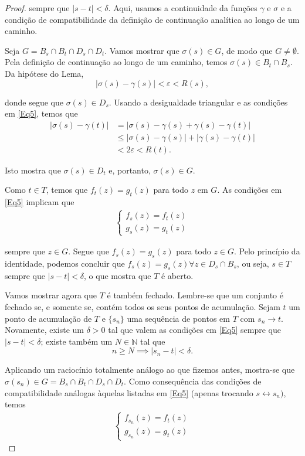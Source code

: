 \begin{proof}
sempre que $|s-t|<\delta$. Aqui, usamos a continuidade da funções $\gamma$ e $\sigma$ 
e a condição de compatibilidade da definição de continuação analítica ao longo de um
caminho.

Seja $G = B_s \cap B_t \cap D_s \cap D_t$. Vamos mostrar que 
$\sigma(s) \in G$, de modo que $G \neq \emptyset$. Pela definição de continuação 
ao longo de um caminho, temos $\sigma(s) \in B_t \cap B_s$. Da hipótese do Lema,
\begin{equation*}
|\sigma(s) - \gamma(s)| < \varepsilon < R(s),
\end{equation*}

donde segue que $\sigma(s) \in D_s$. Usando a desigualdade triangular e as condições em \ref{Eq5}, temos que 
\begin{align*}
|\sigma(s) - \gamma(t)| &= |\sigma(s) - \gamma(s) + \gamma(s) - \gamma(t)| \\
&\leq |\sigma(s) - \gamma(s)| + |\gamma(s) - \gamma(t)| \\
&< 2\varepsilon < R(t).
\end{align*}

Isto mostra que $\sigma(s) \in D_t$ e, portanto, $\sigma(s) \in G$.

Como $t \in T$, temos que $f_t(z) = g_t(z)$ para todo $z$ em $G$. 
As condições em \ref{Eq5} implicam que 
\begin{align*}
    \begin{cases}
    f_s(z) = f_t(z) \\
    g_s(z) = g_t(z)
    \end{cases}
\end{align*}

sempre que $z \in G$. Segue que $f_s(z) = g_s(z)$ para todo $z \in G$. 
Pelo princípio da identidade, podemos concluir que 
$f_s(z) = g_s(z) \forall z \in D_s \cap B_s$, ou seja, $s \in T$ sempre que 
$|s-t|< \delta$, o que mostra que $T$ é aberto.

Vamos mostrar agora que $T$ é também fechado. Lembre-se que um conjunto é fechado 
se, e somente se, contém todos os seus pontos de acumulação. Sejam $t$ um ponto de
acumulação de $T$ e $\{s_n\}$ uma sequência de pontos em $T$ com $s_n \to t$. 
Novamente, existe um $\delta > 0$ tal que valem as condições em \ref{Eq5} sempre que
$|s-t|<\delta$; existe também um $N \in \mathbb{N}$ tal que 
\begin{equation*}
n \geq N \implies |s_n - t| < \delta.
\end{equation*}

Aplicando um raciocínio totalmente análogo ao que fizemos antes, mostra-se que
$\sigma(s_n) \in G = B_s \cap B_t \cap D_s \cap D_t$. Como consequência das 
condições de compatibilidade análogas àquelas listadas em \ref{Eq5} 
(apenas trocando $s \leftrightarrow s_n)$, temos
\begin{align*}
    \begin{cases}
    f_{s_n}(z) = f_t(z) \\
    g_{s_n}(z) = g_t(z)
    \end{cases}
\end{align*}


\end{proof}
